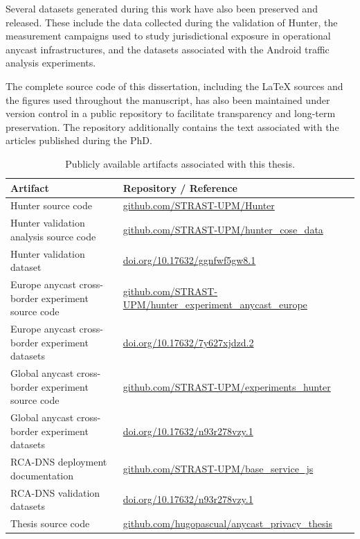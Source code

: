Several datasets generated during this work have also been preserved and released. These include the data collected during the validation of Hunter, the measurement campaigns used to study jurisdictional exposure in operational anycast infrastructures, and the datasets associated with the Android traffic analysis experiments.

The complete source code of this dissertation, including the \LaTeX{} sources and the figures used throughout the manuscript, has also been maintained under version control in a public repository to facilitate transparency and long-term preservation. The repository additionally contains the text associated with the articles published during the PhD.

\begin{table}[ht]
    \centering
    \caption{Publicly available artifacts associated with this thesis.}
    \label{tab:research_artifacts}
    \begin{tabularx}{\textwidth}{X X}
        \toprule
        Artifact & Repository / Reference \\
        \midrule
        \midrule
        Hunter source code &
        \url{github.com/STRAST-UPM/Hunter} \\
        \midrule

        Hunter validation analysis source code &
        \url{github.com/STRAST-UPM/hunter_cose_data} \\
        \midrule

        Hunter validation dataset &
        \url{doi.org/10.17632/ggnfwf5gw8.1} \\
        \midrule

        Europe anycast cross-border experiment source code &
        \url{github.com/STRAST-UPM/hunter_experiment_anycast_europe} \\
        \midrule

        Europe anycast cross-border experiment datasets &
        \url{doi.org/10.17632/7y627xjdzd.2} \\
        \midrule

        Global anycast cross-border experiment source code &
        \url{github.com/STRAST-UPM/experiments_hunter} \\
        \midrule

        Global anycast cross-border experiment datasets &
        \url{doi.org/10.17632/n93r278vzy.1} \\
        \midrule

        RCA-DNS deployment documentation &
        \url{github.com/STRAST-UPM/base_service_js} \\
        \midrule

        RCA-DNS validation datasets &
        \url{doi.org/10.17632/n93r278vzy.1} \\
        \midrule

        Thesis source code &
        \url{github.com/hugopascual/anycast_privacy_thesis} \\
        \bottomrule
    \end{tabularx}
\end{table}

